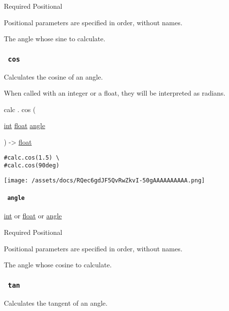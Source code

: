{Required} {{ Positional }}

\label{functions-sin-angle-positional-tooltip}
Positional parameters are specified in order, without names.

The angle whose sine to calculate.

\subsubsection{\texorpdfstring{\texttt{\ cos\ }}{ cos }}\label{functions-cos}

Calculates the cosine of an angle.

When called with an integer or a float, they will be interpreted as
radians.

calc { . } { cos } (

{ \href{/docs/reference/foundations/int/}{int}
\href{/docs/reference/foundations/float/}{float}
\href{/docs/reference/layout/angle/}{angle} }

) -\textgreater{} \href{/docs/reference/foundations/float/}{float}

\begin{verbatim}
#calc.cos(1.5) \
#calc.cos(90deg)
\end{verbatim}

\texttt{[image: /assets/docs/RQec6gdJF5QvRwZkvI-50gAAAAAAAAAA.png]}

\paragraph{\texorpdfstring{\texttt{\ angle\ }}{ angle }}\label{functions-cos-angle}

\href{/docs/reference/foundations/int/}{int} {or}
\href{/docs/reference/foundations/float/}{float} {or}
\href{/docs/reference/layout/angle/}{angle}

{Required} {{ Positional }}

\label{functions-cos-angle-positional-tooltip}
Positional parameters are specified in order, without names.

The angle whose cosine to calculate.

\subsubsection{\texorpdfstring{\texttt{\ tan\ }}{ tan }}\label{functions-tan}

Calculates the tangent of an angle.

